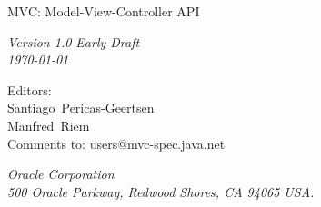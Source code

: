 \begin{titlepage}
\raggedleft

\vspace*{60pt}

{\Huge
\textsf{MVC: Model-View-Controller API}}

\vspace{20pt}

{
\Large\textit{Version 1.0 Early Draft\\
\today}
}

\vspace{40pt}

{\large Editors:\\
Santiago\ Pericas-Geertsen\\
Manfred\ Riem\\
\vspace{10pt}Comments to: users@mvc-spec.java.net
}

\vspace{80pt}

{\small\textit{Oracle Corporation\\
500 Oracle Parkway, Redwood Shores, CA 94065 USA.}
}
\end{titlepage} 
